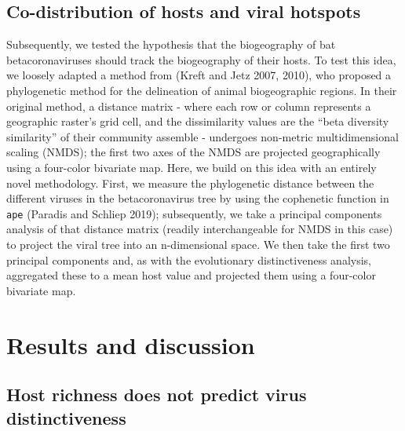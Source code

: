 \documentclass[11pt]{article}
\begin{document}
\hypertarget{co-distribution-of-hosts-and-viral-hotspots}{%
\subsection{Co-distribution of hosts and viral
hotspots}\label{co-distribution-of-hosts-and-viral-hotspots}}

Subsequently, we tested the hypothesis that the biogeography of bat
betacoronaviruses should track the biogeography of their hosts. To test
this idea, we loosely adapted a method from (Kreft and Jetz 2007, 2010),
who proposed a phylogenetic method for the delineation of animal
biogeographic regions. In their original method, a distance matrix -
where each row or column represents a geographic raster's grid cell, and
the dissimilarity values are the ``beta diversity similarity'' of their
community assemble - undergoes non-metric multidimensional scaling
(NMDS); the first two axes of the NMDS are projected geographically
using a four-color bivariate map. Here, we build on this idea with an
entirely novel methodology. First, we measure the phylogenetic distance
between the different viruses in the betacoronavirus tree by using the
cophenetic function in \texttt{ape} (Paradis and Schliep 2019);
subsequently, we take a principal components analysis of that distance
matrix (readily interchangeable for NMDS in this case) to project the
viral tree into an n-dimensional space. We then take the first two
principal components and, as with the evolutionary distinctiveness
analysis, aggregated these to a mean host value and projected them using
a four-color bivariate map.

\hypertarget{results-and-discussion}{%
\section{Results and discussion}\label{results-and-discussion}}

\hypertarget{host-richness-does-not-predict-virus-distinctiveness}{%
\subsection{Host richness does not predict virus
distinctiveness}\label{host-richness-does-not-predict-virus-distinctiveness}}
\end{document}

